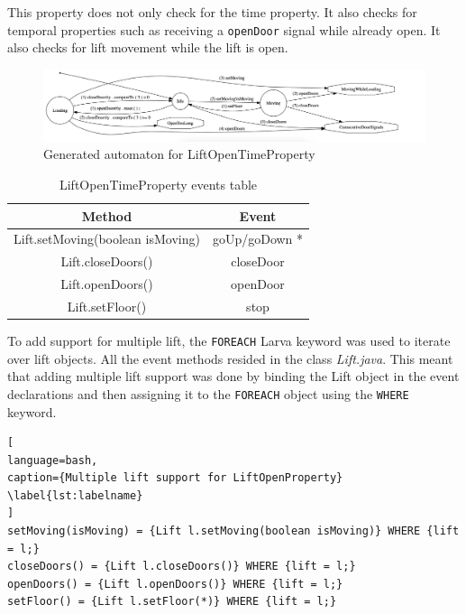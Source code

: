 \documentclass[a4paper, 12pt]{article}
\begin{document}
This property does not only check for the time property. It also checks for temporal properties such as receiving a \texttt{openDoor} signal while already open. It also checks for lift movement while the lift is open. 

\begin{figure}
   \centering
   \includegraphics[width=\textwidth,height=\textheight,keepaspectratio]{images/generated-automaton-LiftOpenTimeProperty} %
   \caption{Generated automaton for LiftOpenTimeProperty}
   \label{fig:generated-automaton-LiftOpenTimeProperty}
\end{figure}

\begin{table}
   \centering
   \begin{tabular}{@{}  |c|c| @{}} %
      \toprule
      Method    & Event \\
      \midrule
      Lift.setMoving(boolean isMoving)   &  goUp/goDown *\\
      Lift.closeDoors()       & closeDoor  \\
      Lift.openDoors()       & openDoor  \\
      Lift.setFloor() & stop    \\
      \bottomrule
   \end{tabular}
   \caption{LiftOpenTimeProperty events table}
   \label{tab:lift-open-time-property}
\end{table}

To add support for multiple lift, the \texttt{FOREACH} Larva keyword was used to iterate over lift objects. All the event methods resided in the class \textit{Lift.java}. This meant that adding multiple lift support was done by binding the Lift object in the event declarations and then assigning it to the \texttt{FOREACH} object using the \texttt{WHERE} keyword.


\begin{lstlisting}[
language=bash, 
caption={Multiple lift support for LiftOpenProperty}
\label{lst:labelname}
]
setMoving(isMoving) = {Lift l.setMoving(boolean isMoving)} WHERE {lift = l;} 
closeDoors() = {Lift l.closeDoors()} WHERE {lift = l;}
openDoors() = {Lift l.openDoors()} WHERE {lift = l;}
setFloor() = {Lift l.setFloor(*)} WHERE {lift = l;}
\end{lstlisting}
\end{document}
